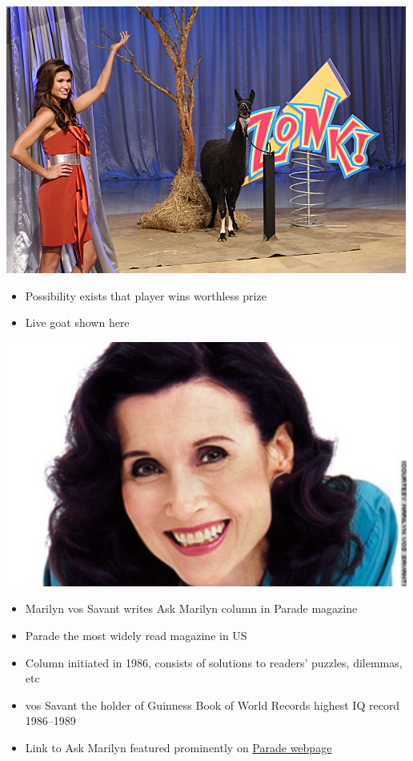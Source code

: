 \documentclass[handout]{beamer}
\theoremstyle{definition}
\begin{document}
\begin{frame}
\begin{center}\includegraphics[scale=1.25]{Goat}\end{center}
\begin{itemize}
\item Possibility exists that player wins worthless prize
\item Live goat shown here
\end{itemize}
\end{frame}

\begin{frame}
\begin{center}\includegraphics[scale=.5]{VosSavant}\end{center}
\begin{itemize}
\item Marilyn vos Savant writes \alert{Ask Marilyn}
column in \alert{Parade} magazine
\item Parade the most widely read magazine in US
\item Column initiated in 1986, consists of solutions
to readers' puzzles, dilemmas, etc
\item vos Savant the holder of \alert{Guinness Book of World Records}
highest IQ record 1986--1989
\item Link to \alert{Ask Marilyn} featured prominently on
\href{http://parade.com}{\color{blue}Parade webpage}
\end{itemize}
\end{frame}
\end{document}
